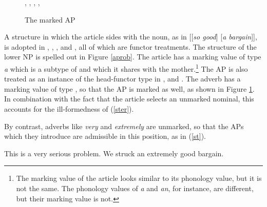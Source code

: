 \documentclass[output=paper]{langsci/langscibook}
\begin{document}
\begin{figure}
\begin{center}
\tree
{,
  {,    
    {}},
  {,
    {}}}
\caption{\label{sohow} The marked AP }
\end{center}
\end{figure}

A structure in which the article sides with the noun, as in [[\emph{so good}] [\emph{a bargain}]], 
is adopted in \citet{VanEynde07}, \citet{KimSells11}, \citet{KaySag12}, 
\citet{ArnoldSadler14} and \citet{VanEynde18}, all of which are functor treatments. 
The structure of the lower NP is spelled out in Figure \ref{aprob}. 
The article has a {\sc marking} value of type \emph{a} which is a subtype of  and which it
shares with the mother.\footnote{The {\sc marking} value of the article looks similar to its 
{\sc phonology} value, but it is not the same. The {\sc phonology} values of \emph{a} and \emph{an}, 
for instance, are different, but their {\sc marking} value is not.} 
The AP is also treated as an instance of the head-functor type 
in \citet{VanEynde07}, \citet{KimSells11} and \citet{VanEynde18}. 
The adverb has a {\sc marking} value of type , 
so that the AP is marked as well, as shown in Figure \ref{sohow}.   
In combination with the fact that the article selects an unmarked nominal, 
this accounts for the ill-formedness of (\ref{ster}). 

\begin{exe}
\ex\label{ster}
\begin{xlist}
\end{xlist}
\end{exe}

\noindent
By contrast, adverbs like \emph{very} and \emph{extremely} are unmarked,
so that the APs which they introduce are admissible in this position, as in (\ref{st}).  

\begin{exe}
\ex\label{st}
\begin{xlist}
\ex  This is a very serious problem. 
\ex  We struck an extremely good bargain. 
\end{xlist} 
\end{exe} 
\end{document}
